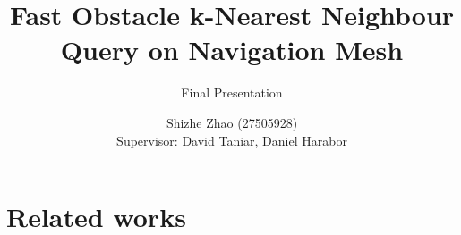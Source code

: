 \documentclass{beamer}
\title[Fast Obstacle k-Nearest Neighbour Query on Navigation Mesh]{
    Fast Obstacle k-Nearest Neighbour Query on Navigation Mesh \\
}
\subtitle {Final Presentation}
\date{}
\author[Shizhe Zhao]{
    Shizhe Zhao (27505928)\\
    Supervisor: David Taniar, Daniel Harabor
}
\begin{document}


% 
\section{Related works}


% 





\end{document}
